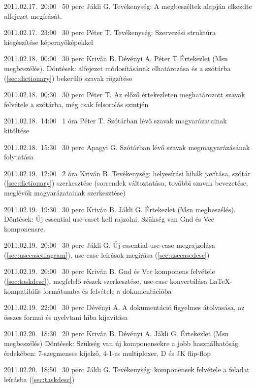 \begin{naplo}
\bejegyzes
{2011.02.17.~20:00~}
{50 perc}
{Jákli G.}
{Tevékenység: A megbeszéltek alapján el\-kezdte  alfejezet megírását.}

\bejegyzes
{2011.02.17.~23:00~}
{30 perc}
{Péter T.}
{Tevékenység: Szervezési struktúra kiegészí\-tése képernyőképekkel}

\bejegyzes
{2011.02.18.~00:00~}
{30 perc}
{Kriván B.\newline
Dévényi A.\newline
Péter T}
{Értekezlet (Msn megbeszélés).\newline
Döntések:  alfejezet módosításának elhatározása és a szótárba (\ref{sec:dictionary}) bekerülő szavak rögzítése}

\bejegyzes
{2011.02.18.~00:30~}
{30 perc}
{Péter T.}
{Az előző értekezleten meghatározott szavak felvétele a szótárba, még csak felsorolás szint\-jén}

\bejegyzes
{2011.02.18.~14:00~}
{1 óra}
{Péter T.}
{Szótárban lévő szavak magyarázatainak kitöl\-tése}

\bejegyzes
{2011.02.18.~15:30~}
{30 perc}
{Apagyi G.}
{Szótárban lévő szavak megmagyarázásának folytatása}

\bejegyzes
{2011.02.19.~12:00~}
{2 óra}
{Kriván B.}
{Tevékenység: helyesírási hibák javítása, szó\-tár (\ref{sec:dictionary}) szerkesztése (sorrendek változtatása, további szavak bevezetése, meglévők magya\-rázatainak szerkesztése)}

\bejegyzes
{2011.02.19.~19:30~}
{30 perc}
{Kriván B.\newline
Jákli G.}
{Értekezlet (Msn megbeszélés).\newline
Döntések: Új essential use-caset kell rajzolni. Szükség van Gnd és Vcc komponensre.}

\bejegyzes
{2011.02.19.~20:00~}
{30 perc}
{Jákli G.}
{Új essential use-case megrajzolása (\ref{sec:usecasediagram}), use-case leírások megírása (\ref{sec:usecasedesc})}

\bejegyzes
{2011.02.19.~20:00~}
{30 perc}
{Kriván B.}
{Gnd és Vcc komponens felvétele (\ref{sec:taskdesc}), megfelelő részek szerkesztése, use-case konvertálása \LaTeX{}-kompatibilis formátumba és felvétele a dokumentációba}

\bejegyzes
{2011.02.19.~22:00~}
{30 perc}
{Dévényi A.}
{A dokumentáció figyelmes átolvasása, az összes formai és nyelvtani hiba kijavítása}

\bejegyzes
{2011.02.20.~18:30~}
{20 perc}
{Kriván B.\newline
Dévényi A.\newline
Jákli G.}
{Értekezlet (Msn megbeszélés)\newline
Döntések: Szükség van új komponensekre a jobb használhatóság érdekében: 7-szegmenses kijelző, 4-1-es multiplexer, D és JK flip-flop}

\bejegyzes
{2011.02.20.~18:50~}
{30 perc}
{Jákli G.}
{Tevékenység: komponensek felvétele a feladat leírásba (\ref{sec:taskdesc})}

\end{naplo}

